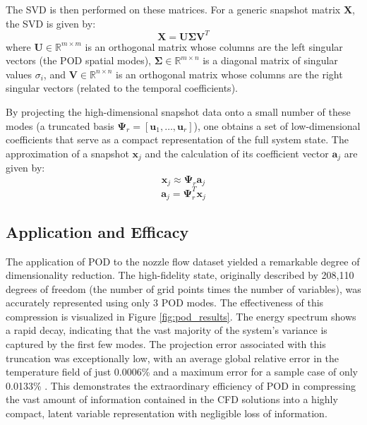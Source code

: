 \documentclass[tg, EN]{ufabcFHZh_tg}
\begin{document}
The SVD is then performed on these matrices. For a generic snapshot matrix $\mathbf{X}$, the SVD is given by:
\begin{equation}
\mathbf{X} = \mathbf{U} \mathbf{\Sigma} \mathbf{V}^T
\end{equation}
where $\mathbf{U} \in \mathbb{R}^{m \times m}$ is an orthogonal matrix whose columns are the left singular vectors (the POD spatial modes), $\mathbf{\Sigma} \in \mathbb{R}^{m \times n}$ is a diagonal matrix of singular values $\sigma_i$, and $\mathbf{V} \in \mathbb{R}^{n \times n}$ is an orthogonal matrix whose columns are the right singular vectors (related to the temporal coefficients).

By projecting the high-dimensional snapshot data onto a small number of these modes (a truncated basis $\mathbf{\Psi}_r = [\mathbf{u}_1, \dots, \mathbf{u}_r]$), one obtains a set of low-dimensional coefficients that serve as a compact representation of the full system state. The approximation of a snapshot $\mathbf{x}_j$ and the calculation of its coefficient vector $\mathbf{a}_j$ are given by:
\begin{equation}
\mathbf{x}_j \approx \mathbf{\Psi}_r \mathbf{a}_j
\end{equation}
\begin{equation}
\mathbf{a}_j = \mathbf{\Psi}_r^T \mathbf{x}_j
\end{equation}

\subsection{Application and Efficacy}

The application of POD to the nozzle flow dataset yielded a remarkable degree of dimensionality reduction. The high-fidelity state, originally described by 208,110 degrees of freedom (the number of grid points times the number of variables), was accurately represented using only 3 POD modes. The effectiveness of this compression is visualized in Figure \ref{fig:pod_results}. The energy spectrum shows a rapid decay, indicating that the vast majority of the system's variance is captured by the first few modes. The projection error associated with this truncation was exceptionally low, with an average global relative error in the temperature field of just 0.0006\% and a maximum error for a sample case of only 0.0133\% \citep{moreira2023}. This demonstrates the extraordinary efficiency of POD in compressing the vast amount of information contained in the CFD solutions into a highly compact, latent variable representation with negligible loss of information.
\end{document}
